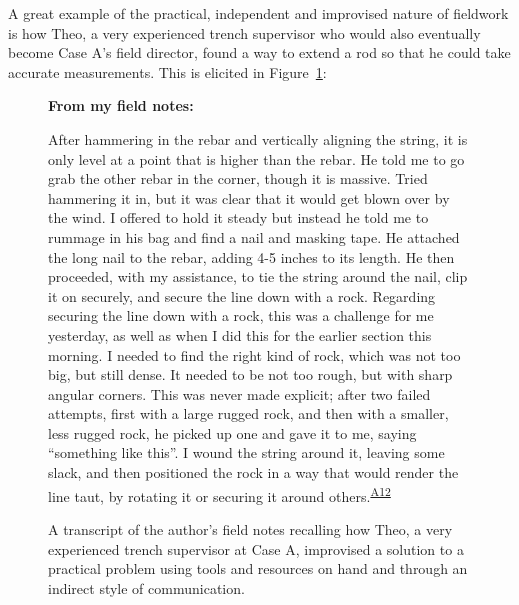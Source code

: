 \documentclass[
]{article}
\begin{document}
A great example of the practical, independent and improvised nature of
fieldwork is how Theo, a very experienced trench supervisor who would
also eventually become Case A's field director, found a way to extend a
rod so that he could take accurate measurements. This is elicited in
Figure~\ref{fig-nail}:

\begin{figure}

\begin{minipage}{\linewidth}
\textbf{From my field notes:}\end{minipage}%
\newline
\begin{minipage}{\linewidth}
After hammering in the rebar and vertically aligning the string, it is
only level at a point that is higher than the rebar. He told me to go
grab the other rebar in the corner, though it is massive. Tried
hammering it in, but it was clear that it would get blown over by the
wind. I offered to hold it steady but instead he told me to rummage in
his bag and find a nail and masking tape. He attached the long nail to
the rebar, adding 4-5 inches to its length. He then proceeded, with my
assistance, to tie the string around the nail, clip it on securely, and
secure the line down with a rock. Regarding securing the line down with
a rock, this was a challenge for me yesterday, as well as when I did
this for the earlier section this morning. I needed to find the right
kind of rock, which was not too big, but still dense. It needed to be
not too rough, but with sharp angular corners. This was never made
explicit; after two failed attempts, first with a large rugged rock, and
then with a smaller, less rugged rock, he picked up one and gave it to
me, saying ``something like this''. I wound the string around it,
leaving some slack, and then positioned the rock in a way that would
render the line taut, by rotating it or securing it around
others.\textsuperscript{\hyperref[sec-A12]{A12}}\end{minipage}%

\caption{\label{fig-nail}A transcript of the author's field notes
recalling how Theo, a very experienced trench supervisor at Case A,
improvised a solution to a practical problem using tools and resources
on hand and through an indirect style of communication.}

\end{figure}%
\end{document}
